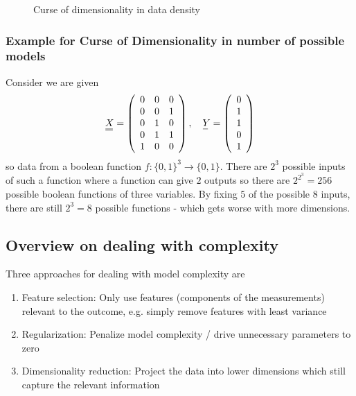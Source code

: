 \begin{figure}[!htb]
    \centering
    
    \caption{Curse of dimensionality in data density}
    \label{fig:curse_dens}
\end{figure}


\subsubsection{Example for Curse of Dimensionality in number of possible models\skipthis}
Consider we are given
\begin{equation}
    \mat{X}=\left(\begin{array}{lll}
    0 & 0 & 0 \\
    0 & 0 & 1 \\
    0 & 1 & 0 \\
    0 & 1 & 1 \\
    1 & 0 & 0
    \end{array}\right), \quad \vec{Y}=\left(\begin{array}{l}
    0 \\
    1 \\
    1 \\
    0 \\
    1
    \end{array}\right)
\end{equation}
so data from a boolean function $f:\{0,1\}^3 \rightarrow \{0,1\}$.
There are $2^3$ possible inputs of such a function where a function
can give $2$ outputs so there are $2^{2^3} = 256$ possible boolean functions
of three variables. By fixing $5$ of the possible $8$ inputs, there are
still $2^3 = 8$ possible functions - which \textcolor{red1}{gets worse 
with more dimensions}.


\subsection{Overview on dealing with complexity}
Three approaches for dealing with model complexity are
\begin{enumerate}
    \item \textcolor{blue1}{Feature selection}: Only use features (components of the measurements) relevant to the outcome, e.g. simply remove features with least variance
    \item \textcolor{blue1}{Regularization}: Penalize model complexity / drive unnecessary parameters to zero
    \item \textcolor{blue1}{Dimensionality reduction}: Project the data into lower dimensions which still capture
    the relevant information
\end{enumerate}

